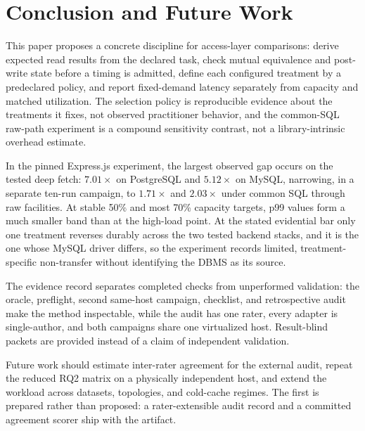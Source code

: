 \section{Conclusion and Future Work}
\label{sec:conclusion}

This paper proposes a concrete discipline for access-layer comparisons: derive expected read results from the declared task, check mutual equivalence and post-write state before a timing is admitted, define each configured treatment by a predeclared policy, and report fixed-demand latency separately from capacity and matched utilization. The selection policy is reproducible evidence about the treatments it fixes, not observed practitioner behavior, and the common-SQL raw-path experiment is a compound sensitivity contrast, not a library-intrinsic overhead estimate.

In the pinned Express.js experiment, the largest observed gap occurs on the tested deep fetch: $7.01\times$ on PostgreSQL and $5.12\times$ on MySQL, narrowing, in a separate ten-run campaign, to $1.71\times$ and $2.03\times$ under common SQL through raw facilities. At stable 50\% and most 70\% capacity targets, p99 values form a much smaller band than at the high-load point. At the stated evidential bar only one treatment reverses durably across the two tested backend stacks, and it is the one whose MySQL driver differs, so the experiment records limited, treatment-specific non-transfer without identifying the DBMS as its source.

The evidence record separates completed checks from unperformed validation: the oracle, preflight,
second same-host campaign, checklist, and retrospective audit make the method inspectable, while the
audit has one rater, every adapter is single-author, and both campaigns share one virtualized host.
Result-blind packets are provided instead of a claim of independent validation.

Future work should estimate inter-rater agreement for the external audit, repeat the reduced RQ2
matrix on a physically independent host, and extend the workload across datasets, topologies, and
cold-cache regimes. The first is prepared rather than proposed: a rater-extensible audit record and a
committed agreement scorer ship with the artifact.
